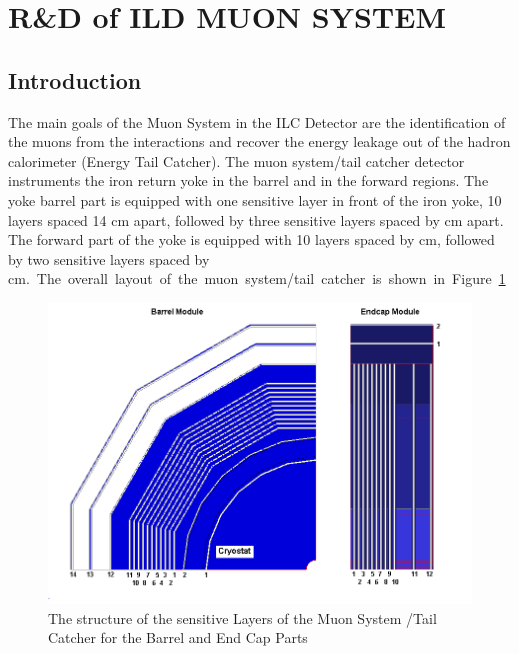\section{R\&D of ILD MUON SYSTEM}

\subsection{Introduction}
The main goals of the Muon System in the ILC Detector are the identification of the muons from the interactions and recover the energy leakage out of the hadron calorimeter (Energy Tail Catcher).
The muon system/tail catcher detector instruments the iron return yoke in the barrel and in the forward regions. The yoke barrel part is equipped with one sensitive layer in front of the iron yoke, 10 layers spaced 14 cm apart, followed by three sensitive layers spaced by \unit[60]{cm} apart. The forward part of the yoke is equipped with 10 layers spaced by \unit[14]{cm}, followed by two sensitive layers spaced by \unit[60]{cm.} The overall layout of the muon system/tail catcher is shown in Figure~\ref{fig:Muon:ILDMuon:schematic}

\begin{figure}
	\centering
	\includegraphics[width=.5\textwidth]{MuonDetector/MuonDetectorILD/muonSchematic}
	\caption{The structure of the sensitive Layers of the Muon System /Tail Catcher for the Barrel and End Cap Parts}
	\label{fig:Muon:ILDMuon:schematic}
\end{figure}

